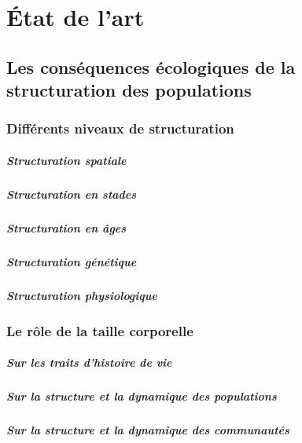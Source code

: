 \chapter{État de l'art}

\section{Les conséquences écologiques de la structuration des populations}

\subsection{Différents niveaux de structuration}

\paragraph{Structuration spatiale}
\paragraph{Structuration en stades}
\paragraph{Structuration en âges}
\paragraph{Structuration génétique}
\paragraph{Structuration physiologique}

\subsection{Le rôle de la taille corporelle}

\paragraph{Sur les traits d'histoire de vie}
\paragraph{Sur la structure et la dynamique des populations}
\paragraph{Sur la structure et la dynamique des communautés}

